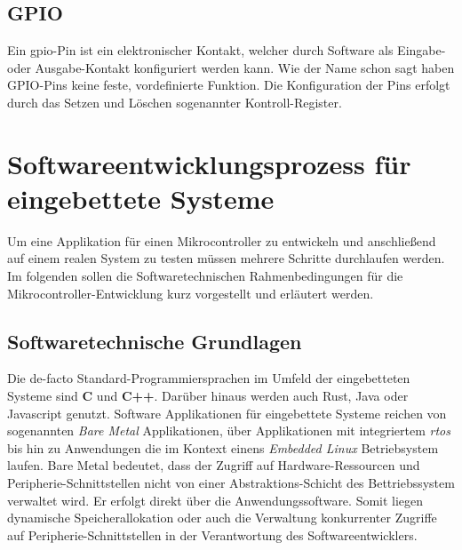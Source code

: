 \subsection{GPIO}

Ein \ac{gpio}-Pin ist ein elektronischer Kontakt, welcher durch Software als
Eingabe- oder Ausgabe-Kontakt konfiguriert werden
kann\cite{Digitec_WGehrke_MWinzker}.
Wie der Name schon sagt haben GPIO-Pins keine feste, vordefinierte Funktion.
Die Konfiguration der Pins erfolgt durch das Setzen und Löschen sogenannter
Kontroll-Register.


\section{Softwareentwicklungsprozess für eingebettete Systeme}

Um eine Applikation für einen Mikrocontroller zu entwickeln und anschließend
auf einem realen System zu testen müssen mehrere Schritte durchlaufen werden.
Im folgenden sollen die Softwaretechnischen Rahmenbedingungen für die
Mikrocontroller-Entwicklung kurz vorgestellt und erläutert werden.

\subsection{Softwaretechnische Grundlagen}

Die de-facto Standard-Programmiersprachen im Umfeld der eingebetteten Systeme
sind \textbf{C} und \textbf{C++}.
Darüber hinaus werden auch Rust, Java oder Javascript genutzt.
\newline
Software Applikationen für eingebettete Systeme reichen von sogenannten
\textit{Bare Metal} Applikationen, über Applikationen mit integriertem
\textit{\ac{rtos}} bis hin zu Anwendungen die im Kontext einens \textit{Embedded Linux}
Betriebsystem laufen.
\newline
Bare Metal bedeutet, dass der Zugriff auf Hardware-Ressourcen und
Peripherie-Schnittstellen nicht von einer Abstraktions-Schicht des
Bettriebssystem verwaltet wird.
Er erfolgt direkt über die Anwendungssoftware.
Somit liegen dynamische Speicherallokation oder auch die Verwaltung
konkurrenter Zugriffe auf Peripherie-Schnittstellen in der Verantwortung des
Softwareentwicklers.

